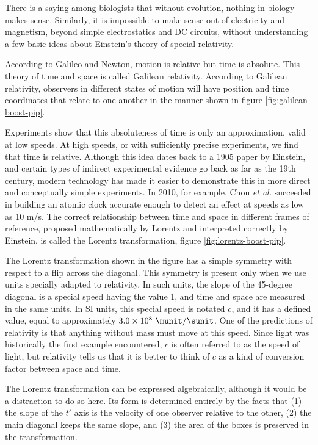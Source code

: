 There is a saying among biologists that without evolution, nothing in biology
makes sense. Similarly, it is impossible to make sense out of electricity and
magnetism, beyond simple electrostatics and DC circuits, without understanding
a few basic ideas about Einstein's theory of special relativity.

According to Galileo and Newton, motion is relative but time is absolute.
This theory of time and space is called Galilean relativity. According to
Galilean relativity, observers in different states of motion will have position
and time coordinates that relate to one another in the manner shown in
figure \ref{fig:galilean-boost-pip}.


Experiments show that this absoluteness of time is only an
approximation, valid at low speeds. At high speeds, or with
sufficiently precise experiments, we find that time is relative.
Although this idea dates back to a 1905 paper by Einstein, and certain
types of indirect experimental evidence go back as far as the 19th
century, modern technology has made it easier to demonstrate this in
more direct and conceptually simple experiments. In 2010, for example,
Chou \emph{et al.} succeeded in building an atomic clock accurate
enough to detect an effect at speeds as low as 10 m/s. The correct
relationship between time and space in different frames of reference,
proposed mathematically by Lorentz and interpreted correctly by Einstein,
is called the Lorentz transformation, figure \ref{fig:lorentz-boost-pip}.


The Lorentz transformation shown in the figure has a simple symmetry with
respect to a flip across the diagonal. This symmetry is present only
when we use units specially adapted to relativity. In such units, the
slope of the 45-degree diagonal is a special speed having the value 1,
and time and space are measured in the same units. In SI units, this
special speed is notated $c$, and it has a defined value, equal to
approximately $3.0\times10^8\ \munit/\sunit$. One of the predictions of
relativity is that anything without mass must move at this speed. Since
light was historically the first example encountered, $c$ is often referred
to as the speed of light, but relativity tells us that it is better to think
of $c$ as a kind of conversion factor between space and time.

The Lorentz transformation can be expressed algebraically, although it would
be a distraction to do so here. Its form is determined entirely by the facts
that (1) the slope of the $t'$ axis is the velocity of one observer relative to
the other, (2) the main diagonal keeps the same slope, and (3) the area of the boxes is preserved
in the transformation.
